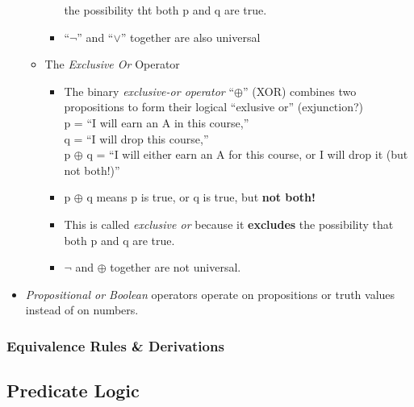 \documentclass[english, 11pt]{article}
\begin{document}
\begin{addmargin}[2em]{2em}
\begin{addmargin}[1em]{2em}
\begin{itemize}
\begin{itemize}
\begin{itemize}
                        the possibility tht both p and q are true.
                        \item ``$\neg$'' and ``$\vee$'' together are also universal
                      \end{itemize}
                  \item The \textit{Exclusive Or} Operator
                    \begin{itemize}
                      \item The binary \textit{exclusive-or operator} ``$\oplus$'' (XOR)
                      combines two propositions to form their logical ``exlusive or'' (exjunction?)
                      \\
                      p = ``I will earn an A in this course,''
                      \\
                      q = ``I will drop this course,''
                      \\
                      p $\oplus$ q = ``I will either earn an A for this course,
                      or I will drop it (but not both!)''

                      \item p $\oplus$ q means p is true, or q is true, but \textbf{not both!}
                      \item This is called \textit{exclusive or} because it
                      \textbf{excludes} the possibility that both p and q are true.
                      \item $\neg$ and $\oplus$ together are not universal.

                \end{itemize}
              \end{itemize}
            \item \textit{Propositional or Boolean} operators operate on
            propositions or truth values instead of on numbers.
          \end{itemize}
    \end{addmargin}


  \subsubsection{Equivalence Rules \& Derivations}


\end{addmargin}
\subsection{Predicate Logic}
\end{document}
